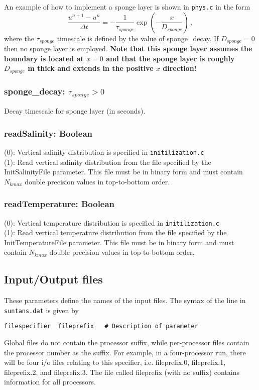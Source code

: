 An example of how to implement a sponge layer is shown in \verb+phys.c+ in the form
\[
\frac{u^{n+1}-u^n}{\Delta t} = -\frac{1}{\tau_{sponge}}\exp\left(-\frac{x}{D_{sponge}}\right)\,,
\]
where the $\tau_{sponge}$ timescale is defined by the value of sponge\_decay.  If $D_{sponge}=0$ then
no sponge layer is employed.  {\bf Note that this sponge layer assumes the boundary is located at $x=0$
and that the sponge layer is roughly $D_{sponge}$ m thick and extends in the positive $x$ direction!}

\subsubsection{sponge\_decay: $\tau_{sponge}>0$}

Decay timescale for sponge layer (in seconds).

\subsubsection{readSalinity: Boolean}

(0): Vertical salinity distribution is specified in \verb+initilization.c+\\
(1): Read vertical salinity distribution from the file specified by the InitSalinityFile parameter.
This file must be in binary form and must contain $N_{kmax}$ double precision values in top-to-bottom
order.

\subsubsection{readTemperature: Boolean}

(0): Vertical temperature distribution is specified in \verb+initilization.c+\\
(1): Read vertical temperature distribution from the file specified by the InitTemperatureFile parameter.
This file must be in binary form and must contain $N_{kmax}$ double precision values in top-to-bottom
order.

\subsection{Input/Output files}

These parameters define the names of the input files.  The syntax of the line in \verb+suntans.dat+ is given by
\begin{verbatim}
filespecifier  fileprefix   # Description of parameter
\end{verbatim}
Global files do not contain the processor suffix, while per-processor files contain the processor
number as the suffix.
For example, in a four-processor run, there will be four i/o files relating
to this specifier, i.e. fileprefix.0, fileprefix.1, fileprefix.2, and fileprefix.3.  The file
called fileprefix (with no suffix) contains information for all processors.  

